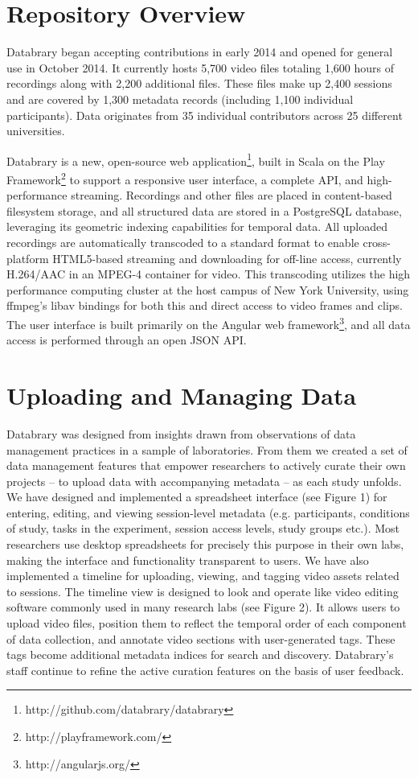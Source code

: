 \documentclass{sig-alternate}
\begin{document}
\section{Repository Overview}
Databrary began accepting contributions in early 2014 and opened for general use in October 2014.
It currently hosts 5,700 video files totaling 1,600 hours of recordings along with 2,200 additional files.
These files make up 2,400 sessions and are covered by 1,300 metadata records (including 1,100 individual participants).
Data originates from 35 individual contributors across 25 different universities.

Databrary is a new, open-source web application\footnote{http://github.com/databrary/databrary}, built in Scala on the Play Framework\footnote{http://playframework.com/} to support a responsive user interface, a complete API, and high-performance streaming.
Recordings and other files are placed in content-based filesystem storage, and all structured data are stored in a PostgreSQL database, leveraging its geometric indexing capabilities for temporal data.
All uploaded recordings are automatically transcoded to a standard format to enable cross-platform HTML5-based streaming and downloading for off-line access, currently H.264/AAC in an MPEG-4 container for video.
This transcoding utilizes the high performance computing cluster at the host campus of New York University, using ffmpeg's libav bindings for both this and direct access to video frames and clips.
The user interface is built primarily on the Angular web framework\footnote{http://angularjs.org/}, and all data access is performed through an open JSON API.

\section{Uploading and Managing Data}

Databrary was designed from insights drawn from observations of data management practices in a sample of laboratories. 
From them we created a set of data management features that empower researchers to actively curate their own projects – to upload data with accompanying metadata – as each study unfolds. 
We have designed and implemented a spreadsheet interface (see Figure 1) for entering, editing, and viewing session-level metadata (e.g. participants, conditions of study, tasks in the experiment, session access levels, study groups etc.). 
Most researchers use desktop spreadsheets for precisely this purpose in their own labs, making the interface and functionality transparent to users.  We have also implemented a timeline for uploading, viewing, and tagging video assets related to sessions.  The timeline view is designed to look and operate like video editing software commonly used in many research labs (see Figure 2).
It allows users to upload video files, position them to reflect the temporal order of each component of data collection, and annotate video sections with user-generated tags. 
These tags become additional metadata indices for search and discovery. 
Databrary’s staff continue to refine the active curation features on the basis of user feedback.
\end{document}
